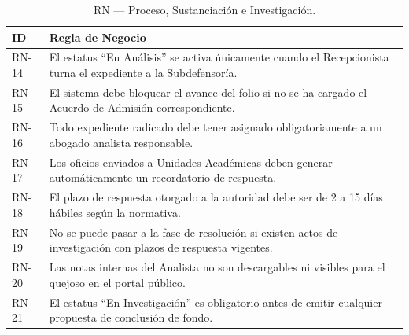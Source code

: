 \documentclass[12pt, oneside, letterpaper]{book}
\begin{document}
\begin{table}[H]
\centering
\caption{RN — Proceso, Sustanciación e Investigación.}
\begin{tabularx}{\textwidth}{@{} l X @{}}
\toprule
\rowcolor[HTML]{2D3E50}
\textbf{\color{white} ID} & \textbf{\color{white} Regla de Negocio} \\ \midrule
\rowcolor[HTML]{F2F4F7}
RN-14 & El estatus ``En Análisis'' se activa únicamente cuando el Recepcionista turna el expediente a la Subdefensoría. \\
RN-15 & El sistema debe bloquear el avance del folio si no se ha cargado el Acuerdo de Admisión correspondiente. \\
\rowcolor[HTML]{F2F4F7}
RN-16 & Todo expediente radicado debe tener asignado obligatoriamente a un abogado analista responsable. \\
RN-17 & Los oficios enviados a Unidades Académicas deben generar automáticamente un recordatorio de respuesta. \\
\rowcolor[HTML]{F2F4F7}
RN-18 & El plazo de respuesta otorgado a la autoridad debe ser de 2 a 15 días hábiles según la normativa. \\
RN-19 & No se puede pasar a la fase de resolución si existen actos de investigación con plazos de respuesta vigentes. \\
\rowcolor[HTML]{F2F4F7}
RN-20 & Las notas internas del Analista no son descargables ni visibles para el quejoso en el portal público. \\
RN-21 & El estatus ``En Investigación'' es obligatorio antes de emitir cualquier propuesta de conclusión de fondo. \\ \bottomrule
\end{tabularx}
\end{table}
\end{document}
